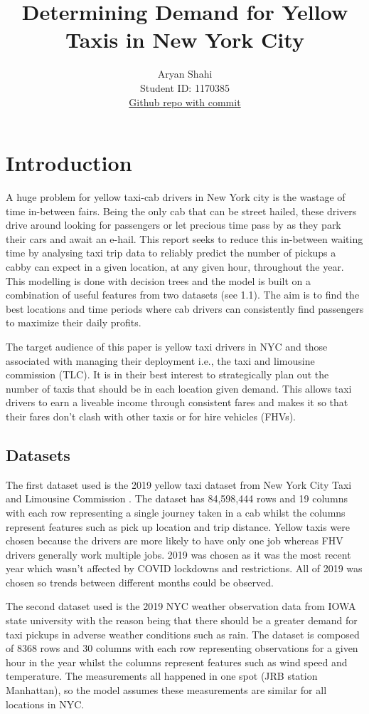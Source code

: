 \documentclass[11pt]{article}
\title{\textbf{Determining Demand for Yellow Taxis in New York City} \\ }
\author{
Aryan Shahi \\
Student ID: 1170385 \\
\href{https://github.com/MAST30034-Applied-Data-Science/mast30034-project-1-AryanShahi20}{Github repo with commit}
}
\begin{document}
\maketitle

\section{Introduction}
A huge problem for yellow taxi-cab drivers in New York city is the wastage of time in-between fairs. Being the only cab that can be street hailed, these drivers drive around looking for passengers or let precious time pass by as they park their cars and await an e-hail. This report seeks to reduce this in-between waiting time by analysing taxi trip data to reliably predict the number of pickups a cabby can expect in a given location, at any given hour, throughout the year. This modelling is done with decision trees and the model is built on a combination of useful features from two datasets (see 1.1). The aim is to find the best locations and time periods where cab drivers can consistently find passengers to maximize their daily profits.

The target audience of this paper is yellow taxi drivers in NYC and those associated with managing their deployment i.e., the taxi and limousine commission (TLC). It is in their best interest to strategically plan out the number of taxis that should be in each location given demand. This allows taxi drivers to earn a liveable income through consistent fares and makes it so that their fares don’t clash with other taxis or for hire vehicles (FHVs).

\subsection{Datasets}
The first dataset used is the 2019 yellow taxi dataset from New York City Taxi and Limousine Commission \cite{TLC}. The dataset has 84,598,444 rows and 19 columns with each row representing a single journey taken in a cab whilst the columns represent features such as pick up location and trip distance. Yellow taxis were chosen because the drivers are more likely to have only one job whereas FHV drivers generally work multiple jobs. 2019 was chosen as it was the most recent year which wasn’t affected by COVID lockdowns and restrictions. All of 2019 was chosen so trends between different months could be observed.

The second dataset used is the 2019 NYC weather observation data from IOWA state university \cite{weather} with the reason being that there should be a greater demand for taxi pickups in adverse weather conditions such as rain. The dataset is composed of 8368 rows and 30 columns with each row representing observations for a given hour in the year whilst the columns represent features such as wind speed and temperature. The measurements all happened in one spot (JRB station Manhattan), so the model assumes these measurements are similar for all locations in NYC. 
\end{document}
